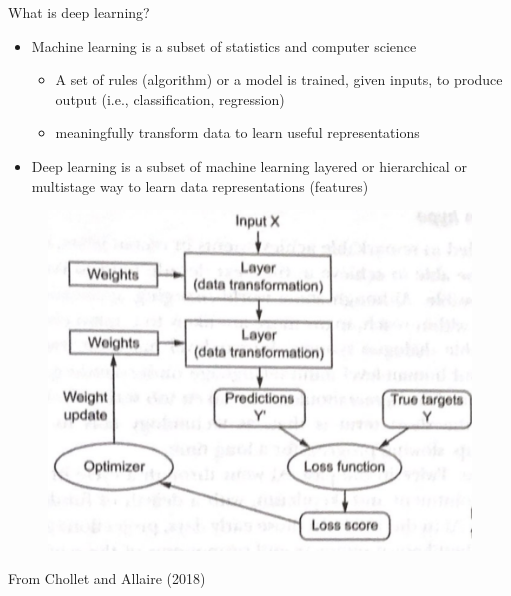 \documentclass{beamer}
\begin{document}
\begin{frame}{What is deep learning?}
\begin{minipage}{0.49\linewidth}
\begin{itemize}
\item Machine learning is a subset of statistics and computer science
\begin{itemize}
\item A set of rules (algorithm) or a model is trained, given inputs, to produce output (i.e., classification, regression) \item meaningfully transform data to learn useful representations
\end{itemize}
\item Deep learning is a subset of machine learning layered or hierarchical or multistage way to learn data representations (features)
\end{itemize}
\end{minipage}
\begin{minipage}{0.49\linewidth}
\begin{figure}
\includegraphics[width=\linewidth]{Images/DL.png}
\end{figure}
From Chollet and Allaire (2018)
\end{minipage}
\end{frame}
\end{document}
